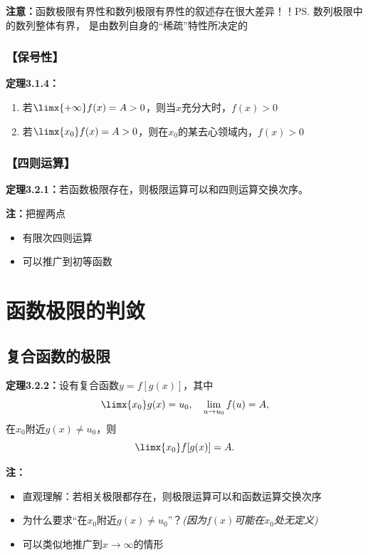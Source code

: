 {\bf 注意：}函数极限有界性和数列极限有界性的叙述存在很大差异！！\ps{数列极限中的数列整体有界，
是由数列自身的“稀疏”特性所决定的}

\subsubsection{【保号性】}

{\bf 定理3.1.4：}
\begin{enumerate}[(1)]
  \setlength{\itemindent}{1cm}
  \item 若$\limx{+\infty}f(x)=A>0$，则当$x$充分大时，$f(x)>0$
  \item 若$\limx{x_0}f(x)=A>0$，则在$x_0$的某去心领域内，$f(x)>0$
\end{enumerate}

\subsubsection{【四则运算】}

{\bf 定理3.2.1：}若函数极限存在，则极限运算可以和四则运算交换次序。

{\bf 注：}把握两点
\begin{itemize}
  \setlength{\itemindent}{1cm}
  \item 有限次四则运算
  \item 可以推广到初等函数
\end{itemize}

\section{函数极限的判敛}

\subsection{复合函数的极限}

{\bf 定理3.2.2：}设有复合函数$y=f[g(x)]$，其中
$$\limx{x_0}g(x)=u_0,\quad\lim\limits_{u\to u_0}f(u)=A,$$
在$x_0$附近$g(x)\ne u_0$，则
$$\limx{x_0}f[g(x)]=A.$$

{\bf 注：}
\begin{itemize}
  \setlength{\itemindent}{1cm}
  \item 直观理解：若相关极限都存在，则极限运算可以和函数运算交换次序
  \item 为什么要求“在$x_0$附近$g(x)\ne u_0$”？{\it (因为$f(x)$可能在$x_0$处无定义)}
  \item 可以类似地推广到$x\to\infty$的情形
\end{itemize}

